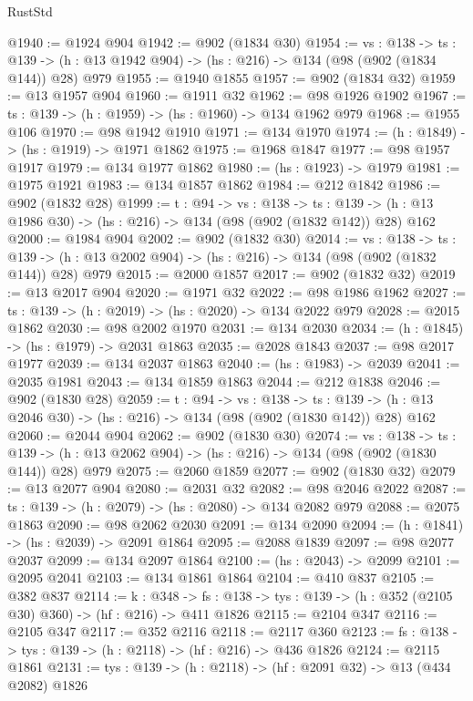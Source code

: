 \begin{lexlean}{RustStd}
\begin{coremodule}
{\begin{coremodule}
{{{{{{{{@1940 := @1924 @904
@1942 := @902 (@1834 @30)
@1954 := {vs : @138} ->
  {ts : @139} -> (h : @13 @1942 @904) -> (hs : @216) -> @134 (@98 (@902 (@1834 @144)) @28) @979
@1955 := @1940 @1855
@1957 := @902 (@1834 @32)
@1959 := @13 @1957 @904
@1960 := @1911 @32
@1962 := @98 @1926 @1902
@1967 := {ts : @139} -> (h : @1959) -> (hs : @1960) -> @134 @1962 @979
@1968 := @1955 @106
@1970 := @98 @1942 @1910
@1971 := @134 @1970
@1974 := (h : @1849) -> (hs : @1919) -> @1971 @1862
@1975 := @1968 @1847
@1977 := @98 @1957 @1917
@1979 := @134 @1977 @1862
@1980 := (hs : @1923) -> @1979
@1981 := @1975 @1921
@1983 := @134 @1857 @1862
@1984 := @212 @1842
@1986 := @902 (@1832 @28)
@1999 := {t : @94} ->
  {vs : @138} ->
  {ts : @139} -> (h : @13 @1986 @30) -> (hs : @216) -> @134 (@98 (@902 (@1832 @142)) @28) @162
@2000 := @1984 @904
@2002 := @902 (@1832 @30)
@2014 := {vs : @138} ->
  {ts : @139} -> (h : @13 @2002 @904) -> (hs : @216) -> @134 (@98 (@902 (@1832 @144)) @28) @979
@2015 := @2000 @1857
@2017 := @902 (@1832 @32)
@2019 := @13 @2017 @904
@2020 := @1971 @32
@2022 := @98 @1986 @1962
@2027 := {ts : @139} -> (h : @2019) -> (hs : @2020) -> @134 @2022 @979
@2028 := @2015 @1862
@2030 := @98 @2002 @1970
@2031 := @134 @2030
@2034 := (h : @1845) -> (hs : @1979) -> @2031 @1863
@2035 := @2028 @1843
@2037 := @98 @2017 @1977
@2039 := @134 @2037 @1863
@2040 := (hs : @1983) -> @2039
@2041 := @2035 @1981
@2043 := @134 @1859 @1863
@2044 := @212 @1838
@2046 := @902 (@1830 @28)
@2059 := {t : @94} ->
  {vs : @138} ->
  {ts : @139} -> (h : @13 @2046 @30) -> (hs : @216) -> @134 (@98 (@902 (@1830 @142)) @28) @162
@2060 := @2044 @904
@2062 := @902 (@1830 @30)
@2074 := {vs : @138} ->
  {ts : @139} -> (h : @13 @2062 @904) -> (hs : @216) -> @134 (@98 (@902 (@1830 @144)) @28) @979
@2075 := @2060 @1859
@2077 := @902 (@1830 @32)
@2079 := @13 @2077 @904
@2080 := @2031 @32
@2082 := @98 @2046 @2022
@2087 := {ts : @139} -> (h : @2079) -> (hs : @2080) -> @134 @2082 @979
@2088 := @2075 @1863
@2090 := @98 @2062 @2030
@2091 := @134 @2090
@2094 := (h : @1841) -> (hs : @2039) -> @2091 @1864
@2095 := @2088 @1839
@2097 := @98 @2077 @2037
@2099 := @134 @2097 @1864
@2100 := (hs : @2043) -> @2099
@2101 := @2095 @2041
@2103 := @134 @1861 @1864
@2104 := @410 @837
@2105 := @382 @837
@2114 := {k : @348} ->
  {fs : @138} -> {tys : @139} -> (h : @352 (@2105 @30) @360) -> (hf : @216) -> @411 @1826
@2115 := @2104 @347
@2116 := @2105 @347
@2117 := @352 @2116
@2118 := @2117 @360
@2123 := {fs : @138} -> {tys : @139} -> (h : @2118) -> (hf : @216) -> @436 @1826
@2124 := @2115 @1861
@2131 := {tys : @139} -> (h : @2118) -> (hf : @2091 @32) -> @13 (@434 @2082) @1826
}}}}}}}}
\end{coremodule}}
\end{coremodule}
\end{lexlean}
